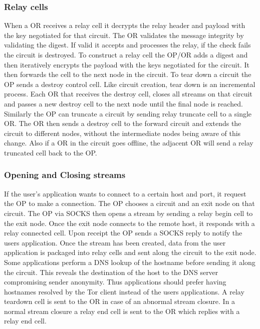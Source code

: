 \documentclass{llncs}
\begin{document}
\subsubsection{Relay cells}
When a OR receives a relay cell it decrypts the relay header and payload with the key negotiated for that circuit. The OR validates the message integrity by validating the digest. If valid it accepts and processes the relay, if the check fails the circuit is destroyed.
To construct a relay cell the OP/OR adds a digest and then iteratively encrypts the payload with the keys negotiated for the circuit. It then forwards the cell to the next node in the circuit.
To tear down a circuit the OP sends a destroy control cell. Like circuit creation, tear down is an incremental process. Each OR that receives the destroy cell, closes all streams on that circuit and passes a new destroy cell to the next node until the final node is reached.
Similarly the OP can truncate a circuit by sending relay truncate cell to a single OR. The OR then sends a destroy cell to the forward circuit and extends the circuit to different nodes, without the intermediate nodes being aware of this change. Also if a OR in the circuit goes offline, the adjacent OR will send a relay truncated cell back to the OP. 

\subsubsection{Opening and Closing streams}
If the user's application wants to connect to a certain host and port, it request the OP to make a connection. The OP chooses a circuit and an exit node on that circuit. The OP via SOCKS then opens a stream by sending a relay begin cell to the exit node. Once the exit node connects to the remote host, it responds with a relay connected cell. Upon receipt the OP sends a SOCKS reply to notify the users application. Once the stream has been created, data from the user application is packaged into relay cells and sent along the circuit to the exit node.
Some applications perform a DNS lookup of the hostname before sending it along the circuit. This reveals the destination of the host to the DNS server compromising sender anonymity. Thus applications should prefer having hostnames resolved by the Tor client instead of the users applications.
A relay teardown cell is sent to the OR in case of an abnormal stream closure. In a normal stream closure a relay end cell is sent to the OR which replies with a relay end cell.
\end{document}
